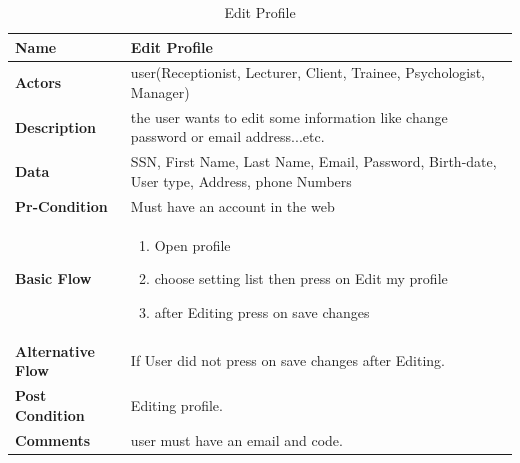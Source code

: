\documentclass[../Psychological_system_web_application.tex]{subfiles}
\begin{document}
	\begin{center}
		\begin{table}[h!]
			\begin{tabular}{ | m{4cm} | m{10cm}| } 
				\hline
			 	\textbf{\large Name}& Edit Profile\\
			 	
				\hline
			  	\textbf{\large Actors}& user(Receptionist, Lecturer, Client, Trainee, Psychologist, Manager)\\ 
								
				\hline
			  	\textbf{\large Description}& the user wants to edit some information like change password or email address...etc.\\
			  	 
				\hline
				\textbf{\large Data}&SSN, First Name, Last Name, Email, Password, Birth-date, User type, Address, phone Numbers \\ 
				
				\hline
				 \textbf{\large Pr-Condition}& Must have an account in the web \\
				
				\hline
				\textbf{\large Basic Flow}&\begin{enumerate}
				\item
					Open profile
				\item
					choose setting list then press on Edit my profile
				\item
					after Editing press on save changes \end{enumerate}				 \\
				
				\hline
				\textbf{\large Alternative Flow}& If User did not press on save changes after Editing.\\ 
								
				\hline
				\textbf{\large Post Condition}& Editing profile.\\ 
								
				\hline
				\textbf{\large Comments}& user must have  an email and code.\\ 
				\hline
			\end{tabular}
			\caption{Edit Profile}
			\label{table:EDIT-PROFILE}
		\end{table}
	\end{center}
	
\end{document}
